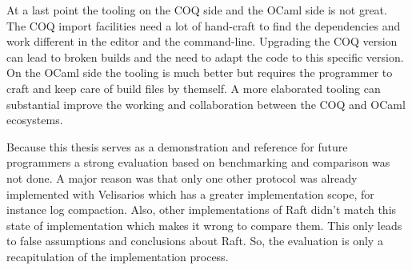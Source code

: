 At a last point the tooling on the COQ side and the OCaml
side is not great. The COQ import facilities need a lot
of hand-craft to find the dependencies and work different
in the editor and the command-line. Upgrading the COQ
version can lead to broken builds and the need to adapt
the code to this specific version. On the OCaml side
the tooling is much better but requires the programmer
to craft and keep care of build files by themself.
A more elaborated tooling can substantial improve
the working and collaboration between the COQ and OCaml
ecosystems.

Because this thesis serves as a demonstration and
reference for future programmers a strong evaluation
based on benchmarking and comparison was not done.
A major reason was that only one other protocol
was already implemented with Velisarios which
has a greater implementation scope, for instance log compaction.
Also, other implementations of Raft didn't match this
state of implementation which makes it wrong to
compare them. This only leads to false assumptions
and conclusions about Raft. So, the evaluation
is only a recapitulation of the implementation process.


